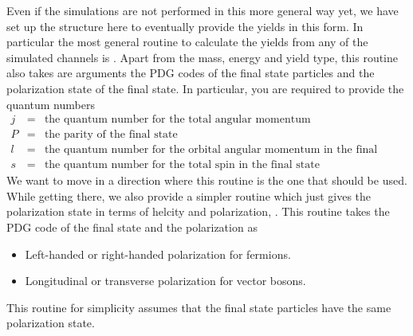 Even if the simulations are not performed in this more general way yet, we have set up the structure here to eventually provide the yields in this form. In particular the most general routine to calculate the yields from any of the simulated channels is . Apart from the mass, energy and yield type, this routine also takes are arguments the PDG codes of the final state particles and the polarization state of the final state. In particular, you are required to provide the quantum numbers
\begin{eqnarray*}
j &=& \mbox{the quantum number for the total angular momentum} \\
P &=& \mbox{the parity of the final state}\\
l &=& \mbox{the quantum number for the orbital angular momentum in the final state} \\
s &=& \mbox{the quantum number for the total spin in the final state} 
\end{eqnarray*}
We want to move in a direction where this routine is the one that should be used. While getting there, we also provide a simpler routine which just gives the polarization state in terms of helcity and polarization, . This routine takes the PDG code of the final state and the polarization as
\begin{itemize}
\item Left-handed or right-handed polarization for fermions. 
\item Longitudinal or transverse polarization for vector bosons.
\end{itemize}
This routine for simplicity assumes that the final state particles have the same polarization state.


